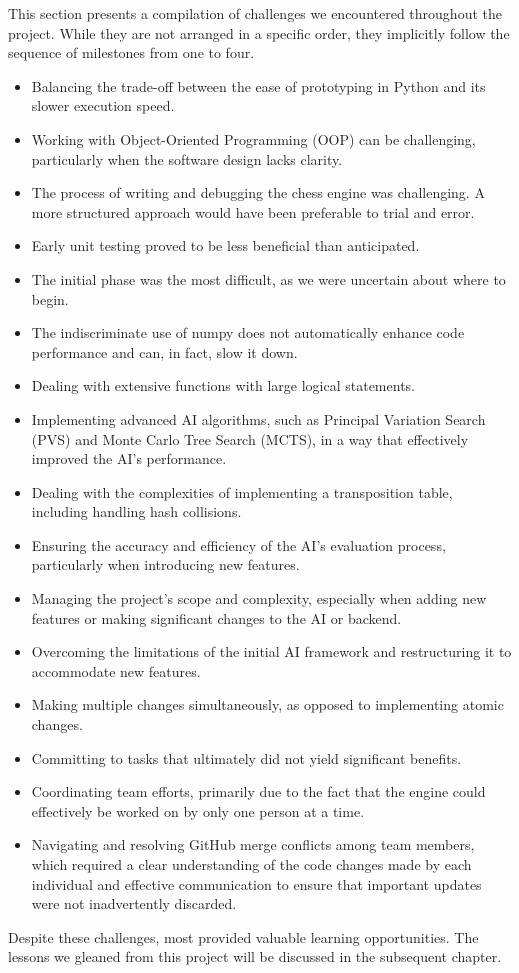 This section presents a compilation of challenges we encountered throughout the project. While they are not arranged in a specific order, they implicitly follow the sequence of milestones from one to four.

\begin{itemize}
\item Balancing the trade-off between the ease of prototyping in Python and its slower execution speed.
\item Working with Object-Oriented Programming (OOP) can be challenging, particularly when the software design lacks clarity.
\item The process of writing and debugging the chess engine was challenging. A more structured approach would have been preferable to trial and error.
\item Early unit testing proved to be less beneficial than anticipated.
\item The initial phase was the most difficult, as we were uncertain about where to begin.
\item The indiscriminate use of numpy does not automatically enhance code performance and can, in fact, slow it down.
\item Dealing with extensive functions with large logical statements.
\item Implementing advanced AI algorithms, such as Principal Variation Search (PVS) and Monte Carlo Tree Search (MCTS), in a way that effectively improved the AI's performance.
\item Dealing with the complexities of implementing a transposition table, including handling hash collisions.
\item Ensuring the accuracy and efficiency of the AI's evaluation process, particularly when introducing new features.
\item Managing the project's scope and complexity, especially when adding new features or making significant changes to the AI or backend.
\item Overcoming the limitations of the initial AI framework and restructuring it to accommodate new features.
\item Making multiple changes simultaneously, as opposed to implementing atomic changes.
\item Committing to tasks that ultimately did not yield significant benefits.
\item Coordinating team efforts, primarily due to the fact that the engine could effectively be worked on by only one person at a time.
\item Navigating and resolving GitHub merge conflicts among team members, which required a clear understanding of the code changes made by each individual and effective communication to ensure that important updates were not inadvertently discarded.
\end{itemize}

Despite these challenges, most provided valuable learning opportunities. The lessons we gleaned from this project will be discussed in the subsequent chapter.
